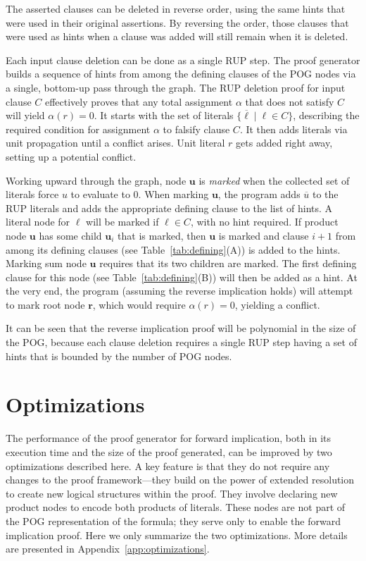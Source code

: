 \documentclass[letterpaper,USenglish,cleveref, autoref, thm-restate]{lipics-v2021}
\newcommand{\obar}[1]{\overline{#1}}
\newcommand{\lit}{\ell}
\newcommand{\assign}{\alpha}
\newcommand{\makenode}[1]{\mathbf{#1}}
\newcommand{\nodeu}{\makenode{u}}
\newcommand{\noder}{\makenode{r}}
\begin{document}
The asserted clauses can be deleted in reverse order, using the same
hints that were used in their original assertions.  By reversing the
order, those clauses that were used as hints when a clause was
added will still remain when it is deleted.

Each input clause deletion can be done as a single RUP step.  The
proof generator builds a sequence of hints from among the defining
clauses of the POG nodes via a single, bottom-up pass through the
graph.  The RUP deletion proof for input clause $C$ effectively proves that any
total assignment $\assign$ that does not satisfy $C$ will yield
$\assign(r) = 0$.  It starts with the set of literals
$\{ \obar{\lit} \mid \lit \in C\}$, describing the required condition for
assignment $\assign$ to falsify clause $C$.
It then
adds literals via unit propagation until a
conflict arises.    Unit literal $r$ gets
added right away, setting up a potential conflict.

Working upward through the graph, node $\nodeu$ is {\em marked} when
the collected set of literals force $u$ to evaluate to $0$.  When marking $\nodeu$, the
program adds $\obar{u}$ to the RUP literals and adds the appropriate
defining clause to the list of hints.  A literal node for
$\lit$ will be marked if $\lit \in C$, with no hint required.  If
product node $\nodeu$ has some child $\nodeu_i$ that is marked, then
$\nodeu$ is marked and clause $i+1$ from among its defining clauses (see Table~\ref{tab:defining}(A)) is
added to the hints.  Marking sum node $\nodeu$ requires that its two children are marked.
The first defining
clause for this node (see Table~\ref{tab:defining}(B)) will then be added as a hint.  At the very end, the program
(assuming the reverse implication holds) will attempt to mark root
node $\noder$, which would require $\assign(r) = 0$, yielding a
conflict.

It can be seen that the reverse implication proof will be polynomial in the size of the POG\@, because
each clause deletion requires a single RUP step having a set of hints that is
bounded by the number of POG nodes.

\section{Optimizations}

The performance of the proof generator for forward implication, both in its execution time and
the size of the proof generated, can be improved by two optimizations
described here.  A key feature is that they do not require any changes
to the proof framework---they build on the power of extended
resolution to create new logical structures within the proof.  They
involve declaring new product nodes to encode both products of literals.
These nodes are not part of the POG
representation of the formula; they serve only to enable the forward
implication proof.  Here we only summarize the two optimizations.
More details are presented in Appendix~\ref{app:optimizations}.
\end{document}
